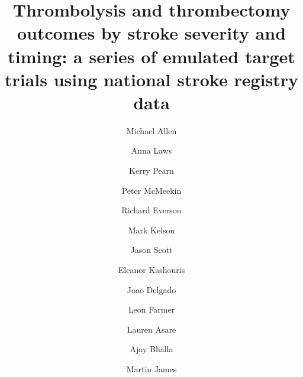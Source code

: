 \title{Thrombolysis and thrombectomy outcomes by stroke severity and timing: a series of emulated target trials using national stroke registry data}


\renewcommand{\thefootnote}{\fnsymbol{footnote}}

\author[*1,2]{Michael Allen}
\author[1,2]{Anna Laws}
\author[1,2]{Kerry Pearn}
\author[4]{Peter McMeekin}
\author[3]{Richard Everson}
\author[3]{Mark Kelson}
\author[4]{Jason Scott}
\author[4]{Eleanor Kashouris}
\author[1]{Joao Delgado}
\author[1,2]{Leon Farmer}
\author[1,2]{Lauren Asare}
\author[5]{Ajay Bhalla}
\author[1,2,6]{Martin James}


\date{}